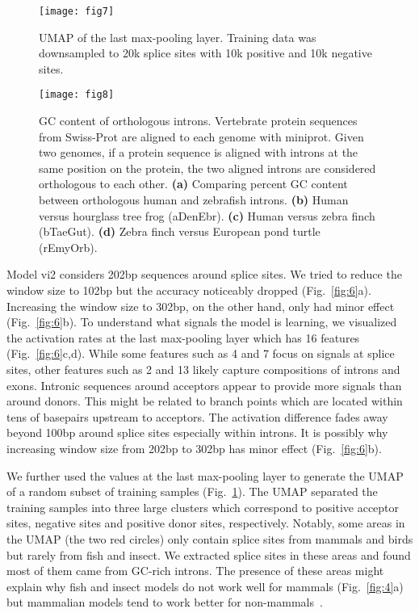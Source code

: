 \documentclass[webpdf,contemporary,large,namedate]{oup-authoring-template}%
\begin{document}
\begin{figure}[bt]
\texttt{[image: fig7]}
\caption{UMAP of the last max-pooling layer.
Training data was downsampled to 20k splice sites with 10k positive and 10k negative sites.
}\label{fig:umap}
\end{figure}

\begin{figure}[bt]
\texttt{[image: fig8]}
\caption{GC content of orthologous introns.
Vertebrate protein sequences from Swiss-Prot are aligned to each genome with miniprot.
Given two genomes, if a protein sequence is aligned with introns at the same position on the protein, the two aligned introns are considered orthologous to each other.
{\bf (a)} Comparing percent GC content between orthologous human and zebrafish introns.
{\bf (b)} Human versus hourglass tree frog (aDenEbr).
{\bf (c)} Human versus zebra finch (bTaeGut).
{\bf (d)} Zebra finch versus European pond turtle (rEmyOrb).
}\label{fig:gc}
\end{figure}

Model vi2 considers 202bp sequences around splice sites.
We tried to reduce the window size to 102bp but the accuracy noticeably dropped (Fig.~\ref{fig:6}a).
Increasing the window size to 302bp, on the other hand, only had minor effect (Fig.~\ref{fig:6}b).
To understand what signals the model is learning, we visualized the activation rates at the last max-pooling layer which has 16 features (Fig.~\ref{fig:6}c,d).
While some features such as 4 and 7 focus on signals at splice sites,
other features such as 2 and 13 likely capture compositions of introns and exons.
Intronic sequences around acceptors appear to provide more signals than around donors.
This might be related to branch points which are located within tens of basepairs upstream to acceptors.
The activation difference fades away beyond 100bp around splice sites especially within introns.
It is possibly why increasing window size from 202bp to 302bp has minor effect (Fig.~\ref{fig:6}b).

We further used the values at the last max-pooling layer to generate the UMAP of a random subset of training samples (Fig.~\ref{fig:umap}).
The UMAP separated the training samples into three large clusters which correspond to
positive acceptor sites, negative sites and positive donor sites, respectively.
Notably, some areas in the UMAP (the two red circles) only contain splice sites from mammals and birds but rarely from fish and insect.
We extracted splice sites in these areas
and found most of them came from GC-rich introns.
The presence of these areas might explain
why fish and insect models do not work well for mammals (Fig.~\ref{fig:4}a)
but mammalian models tend to work better for non-mammals~\citep{McCue:2024aa}.
\end{document}
